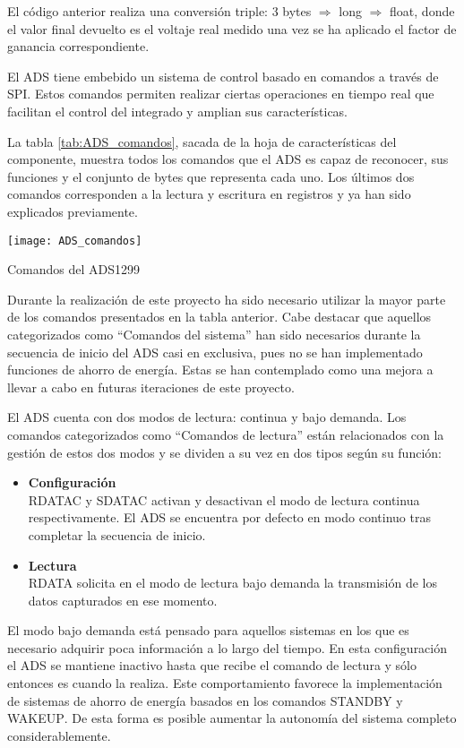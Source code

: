 El código anterior realiza una conversión triple: 3 bytes $\Rightarrow$ long $\Rightarrow$ float, donde el valor final devuelto es el voltaje real medido una vez se ha aplicado el factor de ganancia correspondiente.

El ADS tiene embebido un sistema de control basado en comandos a través de SPI. Estos comandos permiten realizar ciertas operaciones en tiempo real que facilitan el control del integrado y amplian sus características. 

La tabla \ref{tab:ADS_comandos}, sacada de la hoja de características del componente, muestra todos los comandos que el ADS es capaz de reconocer, sus funciones y el conjunto de bytes que representa cada uno. Los últimos dos comandos corresponden a la lectura y escritura en registros y ya han sido explicados previamente.

\begin{table}[H]
    \centering
    \texttt{[image: ADS\_comandos]}
    \caption{Comandos del ADS1299}
    \label{tab:ADS_comandos}
\end{table}

Durante la realización de este proyecto ha sido necesario utilizar la mayor parte de los comandos presentados en la tabla anterior. Cabe destacar que aquellos categorizados como ``Comandos del sistema'' han sido necesarios durante la secuencia de inicio del ADS casi en exclusiva, pues no se han implementado funciones de ahorro de energía. Estas se han contemplado como una mejora a llevar a cabo en futuras iteraciones de este proyecto.

El ADS cuenta con dos modos de lectura: continua y bajo demanda. Los comandos categorizados como ``Comandos de lectura'' están relacionados con la gestión de estos dos modos y se dividen a su vez en dos tipos según su función:
\begin{itemize}
\item \textbf{Configuración}\\
\textsc{RDATAC} y \textsc{SDATAC} activan y desactivan el modo de lectura continua respectivamente. El ADS se encuentra por defecto en modo continuo tras completar la secuencia de inicio.
\item \textbf{Lectura}\\
\textsc{RDATA} solicita en el modo de lectura bajo demanda la transmisión de los datos capturados en ese momento.
\end{itemize} 

El modo bajo demanda está pensado para aquellos sistemas en los que es necesario adquirir poca información a lo largo del tiempo. En esta configuración el ADS se mantiene inactivo hasta que recibe el comando de lectura y sólo entonces es cuando la realiza. Este comportamiento favorece la implementación de sistemas de ahorro de energía basados en los comandos \textsc{STANDBY} y \textsc{WAKEUP}. De esta forma es posible aumentar la autonomía del sistema completo considerablemente.

